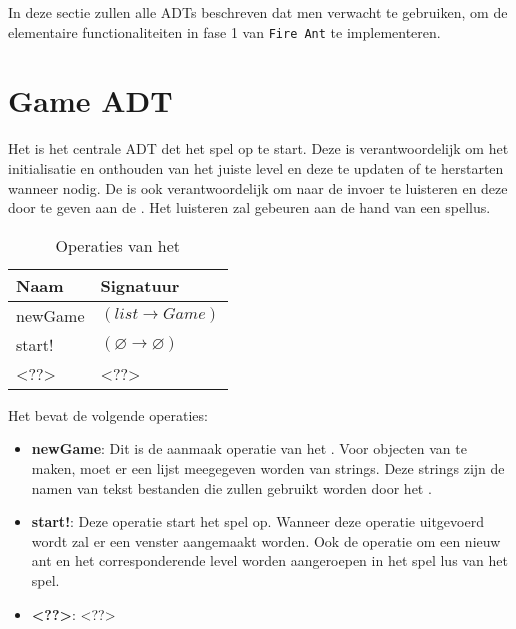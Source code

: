 In deze sectie zullen alle ADTs beschreven dat men verwacht te gebruiken, om de elementaire functionaliteiten in fase 1 van \texttt{Fire Ant} te implementeren.

\section{Game ADT}
\label{section:game}

Het \texttt{} is het centrale ADT det het spel op te start.
Deze is verantwoordelijk om het initialisatie en onthouden van het juiste level en deze te updaten of te herstarten wanneer nodig.
De \texttt{} is ook verantwoordelijk om naar de invoer te luisteren en deze door te geven aan de \texttt{}.
Het luisteren zal gebeuren aan de hand van een spellus. 

\begin{table}[hbt]
\centering
\begin{tabular}{|ll|}
\hline
\rowcolor[HTML]{000000} 
{\color[HTML]{FFFFFF} \textbf{Naam}} & {\color[HTML]{FFFFFF} \textbf{Signatuur}} \\ \hline
newGame                             & $(list \rightarrow Game)$                  \\ \hline
start!                               & $(\varnothing \rightarrow \varnothing)$    \\ \hline
<??>                                 & <??>                                       \\ \hline
\end{tabular}
\caption{Operaties van het \texttt{}}
\label{table:1}
\end{table}

Het \texttt{} bevat de volgende operaties:

\begin{itemize}
	\item \textbf{newGame}: Dit is de aanmaak operatie van het \texttt{}.
		Voor objecten van \texttt{} te maken, moet er een lijst meegegeven worden van strings. Deze strings zijn de namen van tekst bestanden die zullen gebruikt worden door het \texttt{}.
	\item \textbf{start!}: Deze operatie start het spel op. 
		Wanneer deze operatie uitgevoerd wordt zal er een venster aangemaakt worden.
		Ook de operatie om een nieuw ant en het corresponderende level worden aangeroepen in het spel lus van het spel.
	\item \textbf{<??>}: <??>
\end{itemize}

